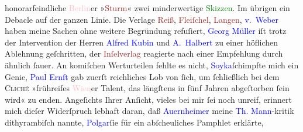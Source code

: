 \documentclass[twoside=false,titlepage=false,open=any, parskip=never, fontsize=12pt, headings=small, chapterprefix=false, appendixprefix=false]{scrbook}
\newcommand{\pbposition}{\depth}
\newcommand{\pb}{\nobreak\hspace{0pt}\raisebox{-0.1em}{\raisebox{\pbposition}{\textnormal{|}}}\nobreak\hspace{0pt}}
\newcommand{\kaufmannsund}{\&}
\begin{document}
                    honorarfeindliche \textcolor{pink}{Berlin}{}\ledrightnote{\textcolor{pink}{Berlin}}er »\textcolor{brown}{Sturm}{}\ledrightnote{\textcolor{brown}{Der Sturm}}« zwei minderwertige \textcolor{green}{Skizzen}{}. Im übrigen ein Debacle
                    auf der ganzen Linie. Die Verlage \textcolor{brown}{Reiß}{}\ledrightnote{\textcolor{brown}{Erich Reiß}}, \textcolor{brown}{Fleiſchel}{}\ledrightnote{\textcolor{brown}{Egon Fleischel {\kaufmannsund} Co.}}, \textcolor{brown}{Langen}{}\ledrightnote{\textcolor{brown}{Albert Langen}}, \textcolor{brown}{\textcolor{blue}{v. Weber}{}\ledrightnote{\textcolor{blue}{Hans von Weber}}}{} haben meine Sachen ohne weitere Begründung refuſiert, \textcolor{blue}{Georg Müller}{}\ledrightnote{\textcolor{blue}{Georg Müller}} iſt trotz der Intervention der Herren \textcolor{blue}{Alfred Kubin}{}\ledrightnote{\textcolor{blue}{Alfred Kubin}} und \textcolor{blue}{A. Halbert}{}\ledrightnote{\textcolor{blue}{Abraham Halbert}} zu einer höflichen Ablehnung geſchritten, der
                        \textcolor{brown}{Inſelverlag}{}\ledrightnote{\textcolor{brown}{Insel-Verlag}} reagierte nach einer Empfehlung
                    durch \label{K_L01946_2v}\label{K_L01946_2h}{ }{\pb}ähnlich ſauer. An komiſchen
                    Werturteilen fehlte es nicht, \textcolor{blue}{Soyka}{}\ledrightnote{\textcolor{blue}{Otto Soyka}}{ }ſchimpfte mich ein Genie, \textcolor{blue}{Paul Ernſt}{}\ledrightnote{\textcolor{blue}{Paul Ernst}} gab zuerſt reichliches Lob von ſich, um
                    ſchließlich bei dem \textsc{Cliché} »frühreifes \textcolor{pink}{Wien}{}\ledrightnote{\textcolor{pink}{Wien}}er Talent, das längſtens in fünf Jahren abgeſtorben
                    ſein wird« zu enden. Angeſichts Ihrer Anſicht, vieles bei mir ſei noch unreif,
                    erinnert mich dieſer Widerſpruch lebhaft daran, daß \textcolor{blue}{Auernheimer}{}\ledrightnote{\textcolor{blue}{Raoul Auernheimer}} meine \textcolor{blue}{Th.
                        Mann}{}\ledrightnote{\textcolor{blue}{Thomas Mann}}-kritik dithyrambiſch nannte, \textcolor{blue}{Polgar}{}\ledrightnote{\textcolor{blue}{Alfred Polgar}}{ }ſie für ein abſcheuliches Pamphlet erklärte,
\end{document}
